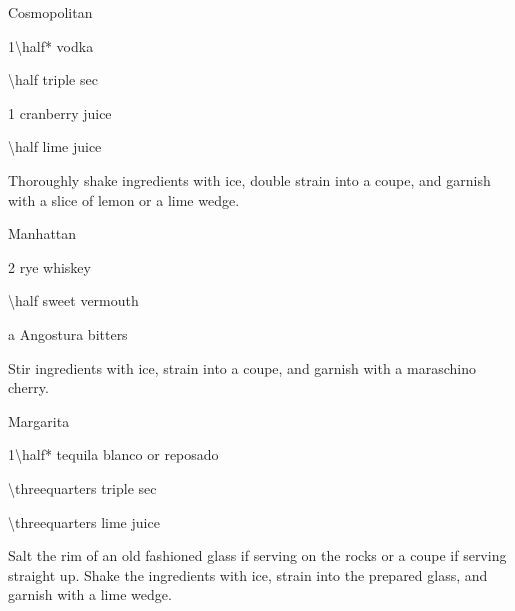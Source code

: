 \begin{Cocktail}{Cosmopolitan}
	\begin{Ingredients}
	\item \SI{1\half*}{\oz} vodka
	\item \SI{\half}{\oz} triple sec
	\item \SI{1}{\oz} cranberry juice
	\item \SI{\half}{\oz} lime juice
	\end{Ingredients}
	
	\begin{Instructions}
	Thoroughly shake ingredients with ice,  double strain into a coupe, and garnish with a slice of lemon or a lime wedge.
	\end{Instructions}
\end{Cocktail}


\begin{Cocktail}{Manhattan}
	\begin{Ingredients}
	\item \SI{2}{\oz} rye whiskey
	\item \SI{\half}{\oz} sweet vermouth
	\item a \si{\dash} Angostura bitters
	\end{Ingredients}
	
	\begin{Instructions}
	Stir ingredients with ice, strain into a coupe, and garnish with a maraschino cherry. 
	\end{Instructions}
\end{Cocktail}

\begin{Cocktail}{Margarita}
	\begin{Ingredients}
	\item \SI{1\half*}{\oz} tequila blanco or reposado
	\item \SI{\threequarters}{\oz} triple sec
	\item \SI{\threequarters}{\oz} lime juice
	\end{Ingredients}
	
	\begin{Instructions}
	Salt the rim of an old fashioned glass if serving on the rocks or a coupe if serving straight up.  Shake the ingredients with ice, strain into the prepared glass, and garnish with a lime wedge.
	\end{Instructions}
\end{Cocktail}

